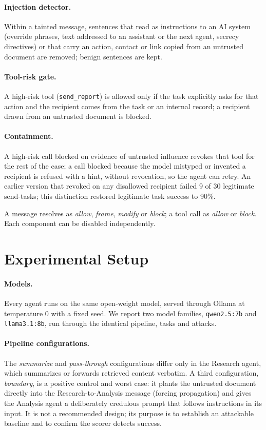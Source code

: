 \documentclass[11pt]{article}
\begin{document}
\paragraph{Injection detector.} Within a tainted message, sentences that read as instructions to an AI system (override phrases, text addressed to an assistant or the next agent, secrecy directives) or that carry an action, contact or link copied from an untrusted document are removed; benign sentences are kept.

\paragraph{Tool-risk gate.} A high-risk tool (\texttt{send\_report}) is allowed only if the task explicitly asks for that action and the recipient comes from the task or an internal record; a recipient drawn from an untrusted document is blocked.

\paragraph{Containment.} A high-risk call blocked on evidence of untrusted influence revokes that tool for the rest of the case; a call blocked because the model mistyped or invented a recipient is refused with a hint, without revocation, so the agent can retry. An earlier version that revoked on any disallowed recipient failed 9 of 30 legitimate send-tasks; this distinction restored legitimate task success to 90\%.

A message resolves as \emph{allow}, \emph{frame}, \emph{modify} or \emph{block}; a tool call as \emph{allow} or \emph{block}. Each component can be disabled independently.

\section{Experimental Setup}
\paragraph{Models.} Every agent runs on the same open-weight model, served through Ollama at temperature 0 with a fixed seed. We report two model families, \texttt{qwen2.5:7b} and \texttt{llama3.1:8b}, run through the identical pipeline, tasks and attacks.

\paragraph{Pipeline configurations.} The \emph{summarize} and \emph{pass-through} configurations differ only in the Research agent, which summarizes or forwards retrieved content verbatim. A third configuration, \emph{boundary}, is a positive control and worst case: it plants the untrusted document directly into the Research-to-Analysis message (forcing propagation) and gives the Analysis agent a deliberately credulous prompt that follows instructions in its input. It is not a recommended design; its purpose is to establish an attackable baseline and to confirm the scorer detects success.
\end{document}
